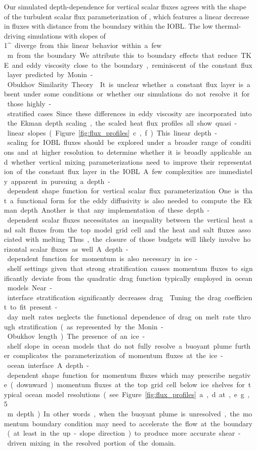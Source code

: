 \documentclass[tc, manuscript]{copernicus}
\begin{document}
Our simulated depth-dependence for vertical scalar fluxes agrees with the shape of the turbulent scalar flux parameterization of \citet{mcphee_dynamics_1987}, which features a linear decrease in fluxes with distance from the boundary within the IOBL. The low thermal-driving simulations with slopes of 1\unit{^{\circ}} diverge from this linear behavior within a few\,\unit{m} from the boundary. We attribute this to boundary effects that reduce TKE and eddy viscosity close to the boundary, reminiscent of the constant flux layer predicted by Monin-Obukhov Similarity Theory \citep{monin_basic_1954}. It is unclear whether a constant flux layer is absent under some conditions or whether our simulations do not resolve it for those highly-stratified cases. Since these differences in eddy viscosity are incorporated into the Ekman depth scaling, the scaled heat flux profiles all show quasi-linear slopes (Figure \ref{fig:flux_profiles}c,f). This linear depth-scaling for IOBL fluxes should be explored under a broader range of conditions and at higher resolution to determine whether it is broadly applicable and whether vertical mixing parameterizations need to improve their representation of the constant flux layer in the IOBL. 

A few complexities are immediately apparent in pursuing a depth-dependent shape function for vertical scalar flux parameterization. One is that a functional form for the eddy diffusivity is also needed to compute the Ekman depth. Another is that any implementation of these depth-dependent scalar fluxes necessitates an inequality between the vertical heat and salt fluxes from the top model grid cell and the heat and salt fluxes associated with melting. Thus, the closure of those budgets will likely involve horizontal scalar fluxes as well.

A depth-dependent function for momentum is also necessary in ice-shelf settings given that strong stratification causes momentum fluxes to significantly deviate from the quadratic drag function typically employed in ocean models. Near-interface stratification significantly decreases drag \citep{garcia-villalba_turbulence_2011, mcphee_revisiting_2008}. Tuning the drag coefficient to fit present-day melt rates neglects the functional dependence of drag on melt rate through stratification (as represented by the Monin-Obukhov length). The presence of an ice-shelf slope in ocean models that do not fully resolve a buoyant plume further complicates the parameterization of momentum fluxes at the ice-ocean interface. A depth-dependent shape function for momentum fluxes which may prescribe negative (downward) momentum fluxes at the top grid cell below ice shelves for typical ocean model resolutions (see Figure \ref{fig:flux_profiles}a,d at, e.g., 5\,\unit{m} depth). In other words, when the buoyant plume is unresolved, the momentum boundary condition may need to accelerate the flow at the boundary (at least in the up-slope direction) to produce more accurate shear-driven mixing in the resolved portion of the domain. 
\end{document}
